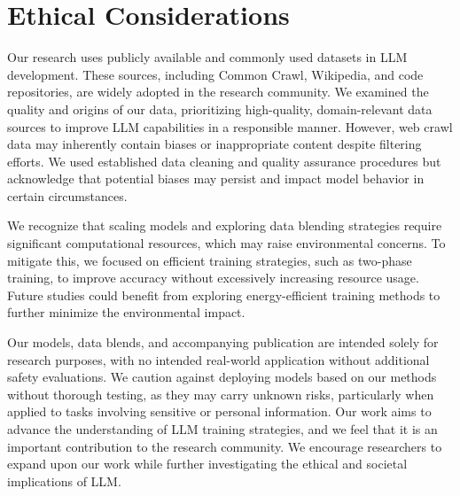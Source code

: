 \documentclass[11pt]{article}
\begin{document}
\section*{Ethical Considerations}


Our research uses publicly available and commonly used datasets in LLM development. %
These sources, including Common Crawl, Wikipedia, and code repositories, are widely adopted in the research community. We examined the quality and origins of our data, prioritizing high-quality, domain-relevant data sources to improve LLM capabilities in a responsible manner. However, web crawl data may inherently contain biases or inappropriate content despite filtering efforts. We used established data cleaning and quality assurance procedures but acknowledge that potential biases may persist and impact model behavior in certain circumstances.


We recognize that scaling models and exploring data blending strategies require significant computational resources, which may raise environmental concerns. To mitigate this, we focused on efficient training strategies, such as two-phase training, to improve accuracy without excessively increasing resource usage. Future studies could benefit from exploring energy-efficient training methods to further minimize the environmental impact. %


Our models, data blends, and accompanying publication are intended solely for research purposes, with no intended real-world application without additional safety evaluations. We caution against deploying models based on our methods without thorough testing, as they may carry unknown risks, particularly when applied to tasks involving sensitive or personal information. Our work aims to advance the understanding of LLM training strategies, and we feel that it is an important contribution to the research community. We encourage researchers to expand upon our work while further investigating the ethical and societal implications of LLM.
\end{document}
